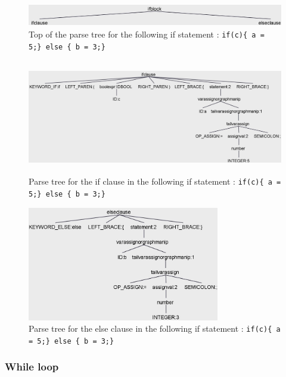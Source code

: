 \begin{figure}[H]
    \centering
    \includegraphics[height = 1cm]{figures/parse_trees/parseTree_ifblock}
    \caption{Top of the parse tree for the following if statement : \texttt{if(c)\{
        a = 5;\}
        else \{
            b = 3;\}}}
    \label{fig:parseTree_ifblock}
\end{figure}

\begin{figure}[H]
    \centering
    \includegraphics[height = 5cm]{figures/parse_trees/parseTree_ifClause}
    \caption{Parse tree for the if clause in the following if statement : \texttt{if(c)\{
    a = 5;\}
    else \{
    b = 3;\}}}
    \label{fig:parseTree_ifClause}
\end{figure}

\begin{figure}[H]
    \centering
    \includegraphics[height = 5cm]{figures/parse_trees/parseTree_elseClause}
    \caption{Parse tree for the else clause in the following if statement : \texttt{if(c)\{
    a = 5;\}
    else \{
    b = 3;\}}}
    \label{fig:parseTree_elseClause}
\end{figure}

\subsubsection*{While loop}

